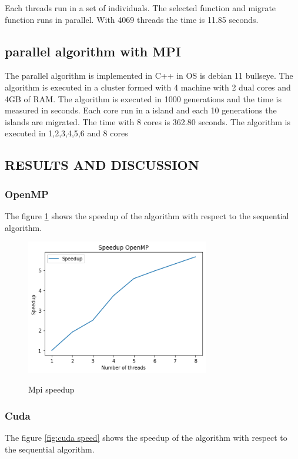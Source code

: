 \documentclass{IEEEtran}
\begin{document}
Each threads run in a set of individuals. The selected function and migrate function runs in parallel. With 4069 threads the time is 11.85 seconds.

\subsection{parallel algorithm with MPI}

The parallel algorithm is implemented in C++ in OS is debian 11 bullseye. The algorithm is executed in a cluster formed with 4 machine with 2 dual cores and 4GB of RAM. The algorithm is executed in 1000 generations and the time is measured in seconds. Each core run in a island and each 10 generations the islands are migrated. The time with 8 cores is 362.80 seconds. The algorithm is executed in 1,2,3,4,5,6 and 8 cores

\subsection{RESULTS AND DISCUSSION}

\subsubsection{OpenMP}

The figure \ref{fig:openmp speed} shows the speedup of the algorithm with respect to the sequential algorithm.

\begin{figure}[ht]
  \caption{Mpi speedup}
  \centering
  \includegraphics[width=8cm]{img/speep_openmp.png}
  \label{fig:openmp speed}
\end{figure}


\subsubsection{Cuda}

The figure \ref{fig:cuda speed} shows the speedup of the algorithm with respect to the sequential algorithm.
\end{document}
